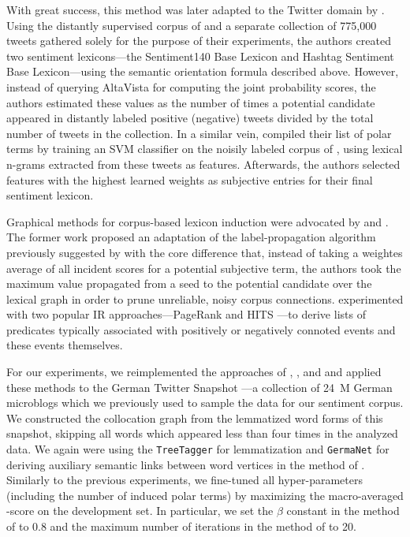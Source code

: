 With great success, this method was later adapted to the Twitter
domain by \citet{Kiritchenko:14}.  Using the distantly supervised
corpus of \citet{Go:09} and a separate collection of 775,000 tweets
gathered solely for the purpose of their experiments, the authors
created two sentiment lexicons---the Sentiment140 Base Lexicon and
Hashtag Sentiment Base Lexicon---using the semantic orientation
formula described above.  However, instead of querying AltaVista for
computing the joint probability scores, the authors estimated these
values as the number of times a potential candidate appeared in
distantly labeled positive (negative) tweets divided by the total
number of tweets in the collection.  In a similar vein,
\citet{Severyn:15a} compiled their list of polar terms by training an
SVM classifier on the noisily labeled corpus of \citet{Go:09}, using
lexical n-grams extracted from these tweets as features.  Afterwards,
the authors selected features with the highest learned weights as
subjective entries for their final sentiment lexicon.

Graphical methods for corpus-based lexicon induction were advocated by
\citet{Velikovich:10} and \citet{Feng:11}.  The former work proposed
an adaptation of the label-propagation algorithm previously suggested
by \citet{Rao:09} with the core difference that, instead of taking a
weightes average of all incident scores for a potential subjective
term, the authors took the maximum value propagated from a seed to the
potential candidate over the lexical graph in order to prune
unreliable, noisy corpus connections.  \citet{Feng:11} experimented
with two popular IR approaches---PageRank \cite{Brin:98} and HITS
\cite{Kleinberg:99}---to derive lists of predicates typically
associated with positively or negatively connoted events and these
events themselves.

For our experiments, we reimplemented the approaches of
\citet{Takamura:05}, \citet{Velikovich:10}, \citet{Kiritchenko:14} and
\citet{Severyn:15} and applied these methods to the German Twitter
Snapshot \cite{Scheffler:14}---a collection of 24~M German microblogs
which we previously used to sample the data for our sentiment corpus.
We constructed the collocation graph from the lemmatized word forms of
this snapshot, skipping all words which appeared less than four times
in the analyzed data.  We again were using the \texttt{TreeTagger}
\cite{Schmid:95} for lemmatization and \texttt{GermaNet} for deriving
auxiliary semantic links between word vertices in the method of
\citet{Takamura:05}.  Similarly to the previous experiments, we
fine-tuned all hyper-parameters (including the number of induced polar
terms) by maximizing the macro-averaged \F{}-score on the development
set.  In particular, we set the $\beta$ constant in the method of
\citet{Takamura:05} to 0.8 and the maximum number of iterations in the
method of \citet{Velikovich:10} to 20.


